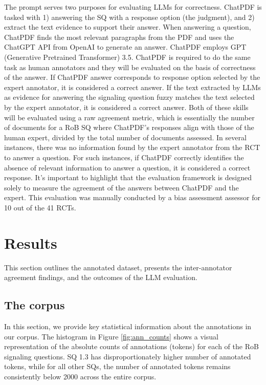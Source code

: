 \documentclass[sn-mathphys,Numbered]{sn-jnl}%
\theoremstyle{thmstyleone}%
\theoremstyle{thmstyletwo}%
\theoremstyle{thmstylethree}%
\begin{document}
The prompt serves two purposes for evaluating LLMs for correctness.
ChatPDF is tasked with 1) answering the SQ with a response option (the judgment), and 2) extract the text evidence to support their answer.
When answering a question, ChatPDF finds the most relevant paragraphs from the PDF and uses the ChatGPT API from OpenAI to generate an answer.
ChatPDF employs GPT (Generative Pretrained Transformer) 3.5.
ChatPDF is required to do the same task as human annotators and they will be evaluated on the basis of correctness of the answer.
If ChatPDF answer corresponds to response option selected by the expert annotator, it is considered a correct answer. 
If the text extracted by LLMs as evidence for answering the signaling question fuzzy matches the text selected by the expert annotator, it is considered a correct answer.
Both of these skills will be evaluated using a raw agreement metric, which is essentially the number of documents for a RoB SQ where ChatPDF's responses align with those of the human expert, divided by the total number of documents assessed.
In several instances, there was no information found by the expert annotator from the RCT to answer a question. 
For such instances, if ChatPDF correctly identifies the absence of relevant information to answer a question, it is considered a correct response.
It's important to highlight that the evaluation framework is designed solely to measure the agreement of the answers between ChatPDF and the expert.
This evaluation was manually conducted by a bias assessment assessor for 10 out of the 41 RCTs.
%
%
%
\section{Results}
\label{sec:results}
%
This section outlines the annotated dataset, presents the inter-annotator agreement findings, and the outcomes of the LLM evaluation.
%
%
%
\subsection{The corpus}
\label{subsec:corpus}
%
In this section, we provide key statistical information about the annotations in our corpus.
The histogram in Figure \ref{fig:ann_counts} shows a visual representation of the absolute counts of annotations (tokens) for each of the RoB signaling questions.
SQ 1.3 has disproportionately higher number of annotated tokens, while for all other SQs, the number of annotated tokens remains consistently below 2000 across the entire corpus.
\end{document}
